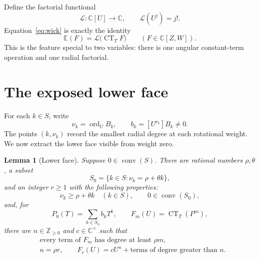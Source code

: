 \documentclass[11pt]{article}
\newtheorem{lemma}[theorem]{Lemma}
\newcommand{\C}{\mathbb C}
\newcommand{\Z}{\mathbb Z}
\newcommand{\E}{\mathbb E}
\newcommand{\CT}{\operatorname{CT}}
\newcommand{\ord}{\operatorname{ord}}
\newcommand{\conv}{\operatorname{conv}}
\begin{document}
Define the factorial functional
\[
  \mathcal L:\C[U]\longrightarrow\C,\qquad
  \mathcal L(U^j)=j!.
\]
Equation~\eqref{eq:wick} is exactly the identity
\begin{equation}\label{eq:expectation-factorization}
  \E(F)=\mathcal L\bigl(\CT_T F\bigr)
  \qquad(F\in\C[Z,W]).
\end{equation}
This is the feature special to two variables: there is one angular
constant-term operation and one radial factorial.

\section{The exposed lower face}

For each \(k\in S\), write
\[
  \nu_k=\ord_U B_k,\qquad
  b_k=[U^{\nu_k}]B_k\neq0.
\]
The points \((k,\nu_k)\) record the smallest radial degree at each
rotational weight.  We now extract the lower face visible from weight zero.

\begin{lemma}[Lower face]\label{lem:face}
Suppose \(0\in\conv(S)\).  There are rational numbers \(\rho,\theta\), a
subset
\[
  S_0=\{k\in S:\nu_k=\rho+\theta k\},
\]
and an integer \(r\geq1\) with the following properties:
\[
  \nu_k\geq\rho+\theta k\quad(k\in S),\qquad
  0\in\conv(S_0),
\]
and, for
\[
  P_0(T)=\sum_{k\in S_0}b_kT^k,\qquad
  F_m(U)=\CT_T(P^m),
\]
there are \(n\in\Z_{\geq0}\) and \(c\in\C^\times\) such that
\begin{align}
  &\text{every term of }F_m\text{ has degree at least }\rho m,
       \label{eq:global-bound}\\
  &n=\rho r,\qquad F_r(U)=cU^n+\text{terms of degree greater than }n.
       \label{eq:leading}
\end{align}
\end{lemma}
\end{document}
